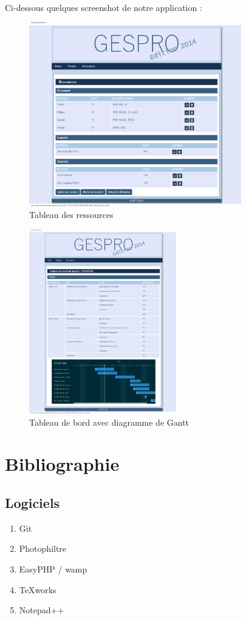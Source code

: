 \documentclass[a4paper, 12pt]{article}
\begin{document}
\paragraph{}Ci-dessous quelques screenshot de notre application :
\begin{figure}[h!]
	\centering
	\includegraphics[height=8cm]{Ressources.png}
	\caption{Tableau des ressources}
\end{figure}
\begin{figure}[h!]
	\centering
	\includegraphics[height=8cm]{Tableau_de_bord.png}
	\caption{Tableau de bord avec diagramme de Gantt}
\end{figure}

\newpage

\section{Bibliographie}
\subsection{Logiciels}
\begin{enumerate}
	\item Git
	\item Photophiltre
	\item EasyPHP / wamp
	\item TeXworks
	\item Notepad++
\end{enumerate}
\end{document}
